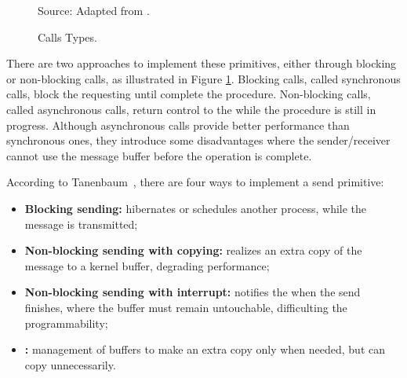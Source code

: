 				\begin{figure}[t]
					\centering
					\caption{Calls Types.}%



					Source: Adapted from \cite{tanenbaum:4ed}.

					\label{fig.calls-types}
				\end{figure}

				There are two approaches to implement these primitives, either
				through blocking or non-blocking calls, as illustrated in Figure \ref{fig.calls-types}.
				Blocking calls, called synchronous calls, block the requesting \cpu
				until complete the procedure.
				Non-blocking calls, called asynchronous calls, return control to the
				\cpu while the procedure is still in progress.
				Although asynchronous calls provide better performance than
				synchronous ones, they introduce some disadvantages where the sender/receiver
				cannot use the message buffer before the operation is complete.

				According to Tanenbaum~\cite{tanenbaum:4ed}, there are four ways to implement
				a send primitive:
				\begin{itemize}
					\item \textbf{Blocking sending:} \cpu hibernates or schedules another
						process, while the message is transmitted;
					\item \textbf{Non-blocking sending with copying:} realizes an extra copy of
						the message to a kernel buffer, degrading performance;
					\item \textbf{Non-blocking sending with interrupt:} notifies the \cpu
						when the send finishes, where the buffer must remain untouchable,
						difficulting the programmability;
					\item \textbf{\cow:} management of buffers to make an extra copy only
						when needed, but can copy unnecessarily.
				\end{itemize}

